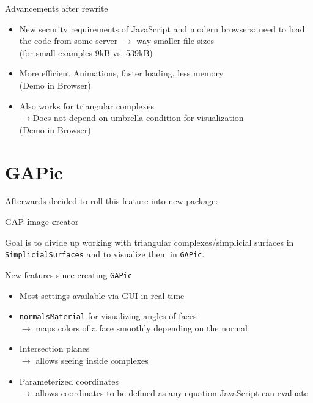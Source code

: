 \documentclass{beamer}
\numberwithin{equation}{aufgabe}
\begin{document}
\begin{frame}
    \begin{exampleblock}{Advancements after rewrite}
        \begin{itemize}[label=-]
            \item New security requirements of JavaScript and modern browsers: need to load the code from some server $\xrightarrow{}$ way smaller file sizes\\
                (for small examples 9kB vs. 539kB)
                \pause
            \item More efficient Animations, faster loading, less memory\\
                (Demo in Browser)
                \pause
            \item Also works for triangular complexes\\
            $\xrightarrow{}$Does not depend on umbrella condition for visualization\\
            (Demo in Browser)
        \end{itemize}
    \end{exampleblock}
\end{frame}

\section{GAPic}
\begin{frame}
    Afterwards decided to roll this feature into new package: \\
    \begin{center}
        GAP \textbf{i}mage \textbf{c}reator    
    \end{center}
    \pause
    Goal is to divide up working with triangular complexes/simplicial surfaces in \texttt{SimplicialSurfaces} and to visualize them in \texttt{GAPic}.
\end{frame}

\begin{frame}
    \begin{exampleblock}{New features since creating \texttt{GAPic}}
        \begin{itemize}[label=-]
            \item Most settings available via GUI in real time \pause
            \item \texttt{normalsMaterial} for visualizing angles of faces\\
            $\xrightarrow{}$ maps colors of a face smoothly depending on the normal \pause
            \item Intersection planes\\
            $\xrightarrow{}$ allows seeing inside complexes \pause
            \item Parameterized coordinates \\
            $\xrightarrow{}$ allows coordinates to be defined as any equation JavaScript can evaluate
        \end{itemize}
    \end{exampleblock}
\end{frame}
\end{document}
